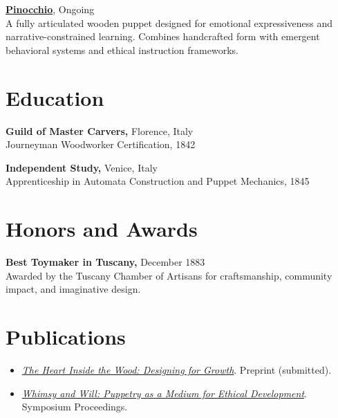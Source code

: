 \documentclass[10pt]{article}
\begin{document}
\textbf{\href{https://en.wikipedia.org/wiki/Pinocchio}{Pinocchio}}, \hfill Ongoing \\
A fully articulated wooden puppet designed for emotional expressiveness and narrative-constrained learning. Combines handcrafted form with emergent behavioral systems and ethical instruction frameworks. \\
\vspace{0.3em}


\section*{Education}

\textbf{Guild of Master Carvers, } \hfill Florence, Italy \\
Journeyman Woodworker Certification, \hfill 1842
\vspace{0.3em}

\textbf{Independent Study, } \hfill Venice, Italy \\
Apprenticeship in Automata Construction and Puppet Mechanics, \hfill 1845
\vspace{0.3em}


\section*{Honors and Awards}

\textbf{Best Toymaker in Tuscany,} \hfill December 1883 \\
Awarded by the Tuscany Chamber of Artisans for craftsmanship, community impact, and imaginative design.
\vspace{0.3em}


\section*{Publications}
\begin{itemize}[leftmargin=*, noitemsep, topsep=0.1em]

    \item \textit{\href{}{The Heart Inside the Wood: Designing for Growth}}. Preprint (submitted).

    \item \textit{\href{}{Whimsy and Will: Puppetry as a Medium for Ethical Development}}. Symposium Proceedings.

\end{itemize}
\end{document}
